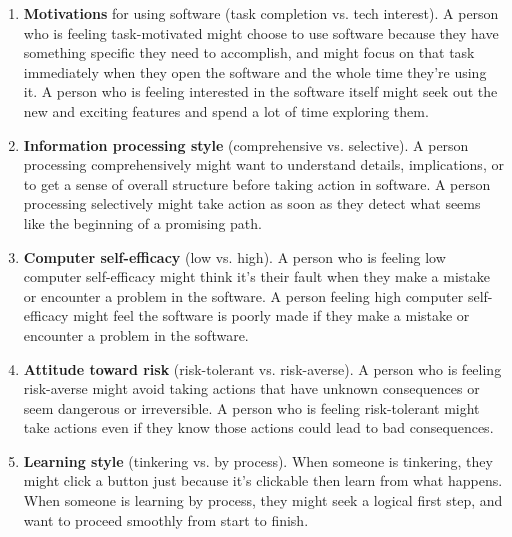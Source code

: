 \begin{enumerate}
\item{\textbf{Motivations} for using software (task completion vs. tech interest). A person who is feeling task-motivated might choose to use software because they have something specific they need to accomplish, and might focus on that task immediately when they open the software and the whole time they're using it. A person who is feeling interested in the software itself might seek out the new and exciting features and spend a lot of time exploring them.}

\item{\textbf{Information processing style} (comprehensive vs. selective). A person processing comprehensively might want to understand details, implications, or to get a sense of overall structure before taking action in software. A person processing selectively might take action as soon as they detect what seems like the beginning of a promising path.}
\item{\textbf{Computer self-efficacy} (low vs. high). A person who is feeling low computer self-efficacy might think it's their fault when they make a mistake or encounter a problem in the software. A person feeling high computer self-efficacy might feel the software is poorly made if they make a mistake or encounter a problem in the software.}
\item{\textbf{Attitude toward risk} (risk-tolerant vs. risk-averse). A person who is feeling risk-averse might avoid taking actions that have unknown consequences or seem dangerous or irreversible. A person who is feeling risk-tolerant might take actions even if they know those actions could lead to bad consequences.}
\item{\textbf{Learning style} (tinkering vs. by process). When someone is tinkering, they might click a button just because it's clickable then learn from what happens. When someone is learning by process, they might seek a logical first step, and want to proceed smoothly from start to finish.}
\end{enumerate}

